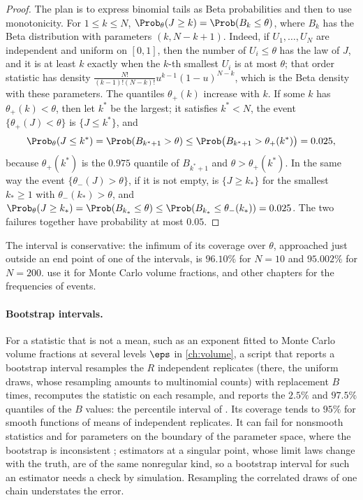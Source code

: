 \begin{refsection}
\begin{proof}
The plan is to express binomial tails as Beta probabilities and then to use monotonicity. For $1\le k\le N$, $\Prob_\theta(J\ge k)=\Prob(B_k\le\theta)$, where $B_k$ has the Beta distribution with parameters $(k,N-k+1)$. Indeed, if $U_1,\dots,U_N$ are independent and uniform on $[0,1]$, then the number of $U_i\le\theta$ has the law of $J$, and it is at least $k$ exactly when the $k$-th smallest $U_i$ is at most $\theta$; that order statistic has density $\frac{N!}{(k-1)!(N-k)!}u^{k-1}(1-u)^{N-k}$, which is the Beta density with these parameters. The quantiles $\theta_+(k)$ increase with $k$. If some $k$ has $\theta_+(k)<\theta$, then let $k^*$ be the largest; it satisfies $k^*<N$, the event $\{\theta_+(J)<\theta\}$ is $\{J\le k^*\}$, and
\[
\Prob_\theta(J\le k^*)=\Prob(B_{k^*+1}>\theta)\le\Prob\bigl(B_{k^*+1}>\theta_+(k^*)\bigr)=0.025,
\]
because $\theta_+(k^*)$ is the $0.975$ quantile of $B_{k^*+1}$ and $\theta>\theta_+(k^*)$. In the same way the event $\{\theta_-(J)>\theta\}$, if it is not empty, is $\{J\ge k_*\}$ for the smallest $k_*\ge1$ with $\theta_-(k_*)>\theta$, and $\Prob_\theta(J\ge k_*)=\Prob(B_{k_*}\le\theta)\le\Prob(B_{k_*}\le\theta_-(k_*))=0.025$. The two failures together have probability at most $0.05$.
\end{proof}

The interval is conservative: the infimum of its coverage over $\theta$, approached just outside an end point of one of the intervals, is $96.10\%$ for $N=10$ and $95.002\%$ for $N=200$.  use it for Monte Carlo volume fractions, and other chapters for the frequencies of events.

\paragraph{Bootstrap intervals.} For a statistic that is not a mean, such as an exponent fitted to Monte Carlo volume fractions at several levels $\eps$ in \cref{ch:volume}, a script that reports a bootstrap interval resamples the $R$ independent replicates (there, the uniform draws, whose resampling amounts to multinomial counts) with replacement $B$ times, recomputes the statistic on each resample, and reports the $2.5\%$ and $97.5\%$ quantiles of the $B$ values: the percentile interval of \textcite{Efron1979}. Its coverage tends to $95\%$ for smooth functions of means of independent replicates. It can fail for nonsmooth statistics and for parameters on the boundary of the parameter space, where the bootstrap is inconsistent \parencite{Andrews2000}; estimators at a singular point, whose limit laws change with the truth, are of the same nonregular kind, so a bootstrap interval for such an estimator needs a check by simulation. Resampling the correlated draws of one chain understates the error.


\end{refsection}
